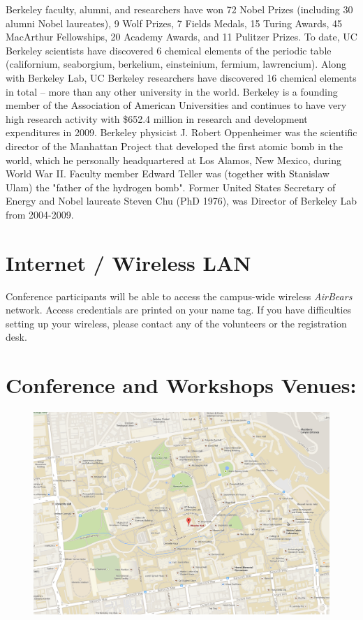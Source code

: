 Berkeley faculty, alumni, and researchers have won 72 Nobel Prizes (including 30 alumni Nobel laureates), 9 Wolf Prizes, 7 Fields Medals, 15 Turing Awards, 45 MacArthur Fellowships, 20 Academy Awards, and 11 Pulitzer Prizes. To date, UC Berkeley scientists have discovered 6 chemical elements of the periodic table (californium, seaborgium, berkelium, einsteinium, fermium, lawrencium). Along with Berkeley Lab, UC Berkeley researchers have discovered 16 chemical elements in total – more than any other university in the world. Berkeley is a founding member of the Association of American Universities and continues to have very high research activity with \$652.4 million in research and development expenditures in 2009. Berkeley physicist J. Robert Oppenheimer was the scientific director of the Manhattan Project that developed the first atomic bomb in the world, which he personally headquartered at Los Alamos, New Mexico, during World War II. Faculty member Edward Teller was (together with Stanislaw Ulam) the "father of the hydrogen bomb". Former United States Secretary of Energy and Nobel laureate Steven Chu (PhD 1976), was Director of Berkeley Lab from 2004-2009.

\vspace{1cm}
\section{Internet / Wireless LAN}

Conference participants will be able to access the campus-wide wireless \emph{AirBears} network. Access credentials are printed on your name tag. If you have difficulties setting up your wireless, please contact any of the volunteers or the registration desk.



\clearpage
{} \section{Conference and Workshops Venues:}
\begin{figure}[h!]
\includegraphics[width=\linewidth]{local_img/maps/wheeler_hall}
\end{figure}

